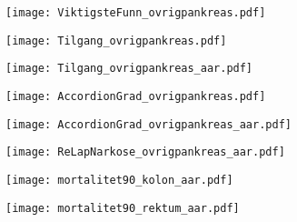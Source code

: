 \documentclass[norsk,a4paper]{article}\usepackage[]{graphicx}\usepackage[]{color}
\begin{document}
\begin{figure}[ht]
\centering
\texttt{[image: ViktigsteFunn\_ovrigpankreas.pdf]}
\caption{}
\end{figure}

\begin{figure}[ht]
\centering
\texttt{[image: Tilgang\_ovrigpankreas.pdf]}
\caption{}
\end{figure}

\begin{figure}[ht]
\centering
\texttt{[image: Tilgang\_ovrigpankreas\_aar.pdf]}
\caption{}
\end{figure}


\begin{figure}[ht]
\centering
\texttt{[image: AccordionGrad\_ovrigpankreas.pdf]}
\caption{}
\end{figure}

\begin{figure}[ht]
\centering
\texttt{[image: AccordionGrad\_ovrigpankreas\_aar.pdf]}
\caption{}
\end{figure}

\begin{figure}[ht]
\centering
\texttt{[image: ReLapNarkose\_ovrigpankreas\_aar.pdf]}
\caption{}
\end{figure}

\begin{figure}[ht]
\centering
\texttt{[image: mortalitet90\_kolon\_aar.pdf]}
\caption{}
\end{figure}

\begin{figure}[ht]
\centering
\texttt{[image: mortalitet90\_rektum\_aar.pdf]}
\caption{}
\end{figure}
\end{document}
